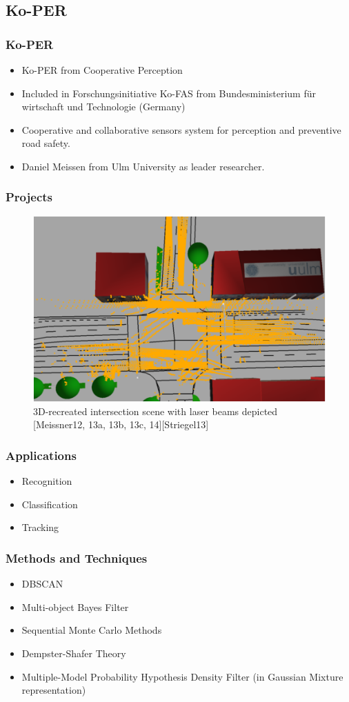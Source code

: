 \documentclass{beamer}
\begin{document}
\subsection{Ko-PER}
\frame
{
	\frametitle{Ko-PER}
	\begin{itemize}
		\item Ko-PER from Cooperative Perception
		\item Included in Forschungsinitiative Ko-FAS from Bundesministerium für wirtschaft und Technologie (Germany)
		\item Cooperative and collaborative sensors system for perception and preventive road safety.
		\item Daniel Meissen from Ulm University as leader researcher.
	\end{itemize}
}
\frame
{
	\frametitle{Projects}	
	\begin{figure}
		\includegraphics[scale=0.4]{fig/meiss1.png}
		\caption{3D-recreated intersection scene with laser beams depicted [Meissner12, 13a, 13b, 13c, 14][Striegel13]}
	\end{figure}
}
\frame
{
	\frametitle{Applications}
	\begin{itemize}
		\item Recognition
		\item Classification
		\item Tracking
	\end{itemize}
}
\frame
{
	\frametitle{Methods and Techniques}
	\begin{itemize}
		\item DBSCAN
		\item Multi-object Bayes Filter
		\item Sequential Monte Carlo Methods
		\item Dempster-Shafer Theory
		\item Multiple-Model Probability Hypothesis Density Filter (in Gaussian Mixture representation)
	\end{itemize}
}
\end{document}
